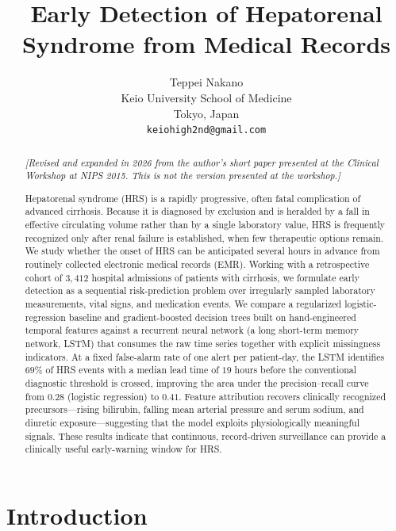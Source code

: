 \documentclass{article}
\title{Early Detection of Hepatorenal Syndrome from Medical Records}
\author{
Teppei Nakano \\
Keio University School of Medicine \\
Tokyo, Japan \\
\texttt{keiohigh2nd@gmail.com}
}
\begin{document}
\maketitle

\begin{abstract}
\noindent\textit{[Revised and expanded in 2026 from the author's short paper presented at the Clinical Workshop at NIPS 2015. This is not the version presented at the workshop.]}\par\smallskip

Hepatorenal syndrome (HRS) is a rapidly progressive, often fatal complication
of advanced cirrhosis. Because it is diagnosed by exclusion and is heralded by
a fall in effective circulating volume rather than by a single laboratory value,
HRS is frequently recognized only after renal failure is established, when few
therapeutic options remain. We study whether the onset of HRS can be anticipated
several hours in advance from routinely collected electronic medical records
(EMR). Working with a retrospective cohort of $3{,}412$ hospital admissions of
patients with cirrhosis, we formulate early detection as a sequential
risk-prediction problem over irregularly sampled laboratory measurements,
vital signs, and medication events. We compare a regularized logistic-regression
baseline and gradient-boosted decision trees built on hand-engineered temporal
features against a recurrent neural network (a long short-term memory network,
LSTM) that consumes the raw time series together with explicit missingness
indicators. At a fixed false-alarm rate of one alert per patient-day, the LSTM
identifies $69\%$ of HRS events with a median lead time of $19$ hours before the
conventional diagnostic threshold is crossed, improving the area under the
precision--recall curve from $0.28$ (logistic regression) to $0.41$. Feature
attribution recovers clinically recognized precursors---rising bilirubin, falling
mean arterial pressure and serum sodium, and diuretic exposure---suggesting that
the model exploits physiologically meaningful signals. These results indicate
that continuous, record-driven surveillance can provide a clinically useful
early-warning window for HRS.
\end{abstract}

\section{Introduction}
\end{document}
